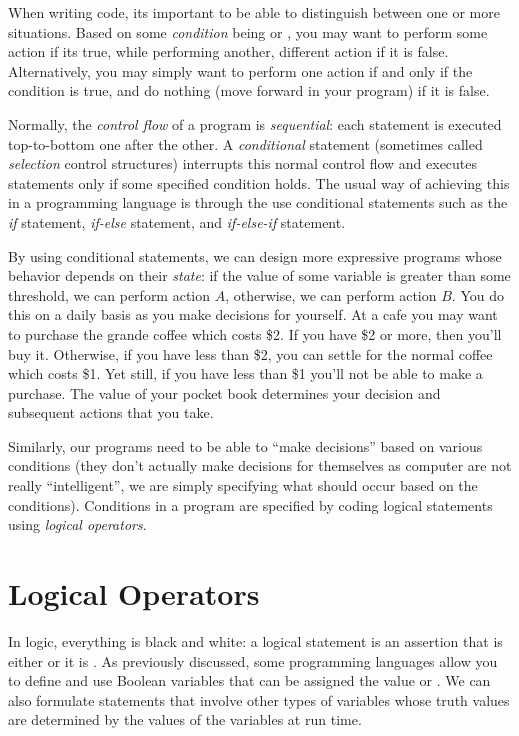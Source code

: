 

When writing code, its important to be able to distinguish between one 
or more situations.  Based on some \emph{condition} being \True or 
\False, you may want to perform some action
if its true, while performing another, different action if it is false.  Alternatively, you may simply
want to perform one action if and only if the condition is true, and do nothing (move forward
in your program) if it is false.

Normally, the \emph{control flow} of a program is \emph{sequential}: each statement is executed
top-to-bottom one after the other.  A \emph{conditional} statement (sometimes called \emph{selection} 
control structures) interrupts this normal control
flow and executes statements only if some specified condition holds.  The usual way of achieving
this in a programming language is through the use conditional statements such as the \emph{if}
statement, \emph{if-else} statement, and \emph{if-else-if} statement.

By using conditional statements, we can design more expressive programs whose behavior 
depends on their \emph{state}: if the value of some variable is greater than some threshold, we
can perform action $A$, otherwise, we can perform action $B$.  You do this on a daily basis
as you make decisions for yourself.  At a cafe you may want to purchase the grande coffee which
costs \$2.  If you have \$2 or more, then you'll buy it.  Otherwise, if you have less than \$2, you 
can settle for the normal coffee which costs \$1.  Yet still, if you have less than \$1 you'll not be
able to make a purchase.  The value of your pocket book determines your decision and subsequent
actions that you take.

Similarly, our programs need to be able to ``make decisions'' based on various conditions 
(they don't actually make decisions for themselves as computer are not really ``intelligent'', 
we are simply specifying what should occur based on the conditions).  Conditions in a program
are specified by coding logical statements using \emph{logical operators}.

\section{Logical Operators}

In logic, everything is black and white: a logical statement is an assertion that is 
either \True or it is \False.  As previously discussed, some programming languages
allow you to define and use Boolean variables that can be assigned the value \True
or \False.  We can also formulate statements that involve other types of variables 
whose truth values are determined by the values of the variables at run time.

